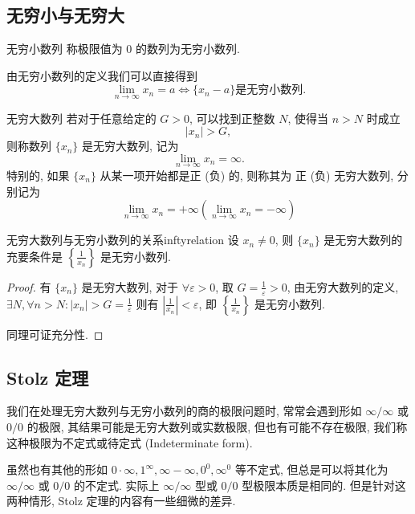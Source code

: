 \documentclass[cn,toc=twocol]{elegantbook}
\begin{document}
\subsection{无穷小与无穷大}
\begin{definition}{无穷小数列}
	称极限值为 $0$ 的数列为无穷小数列.
\end{definition}

由无穷小数列的定义我们可以直接得到
\[
	\lim_{n \to \infty} x_n = a \iff \{x_n - a\} \text{是无穷小数列}.
\]

\begin{definition}{无穷大数列}
	若对于任意给定的 $G > 0$, 可以找到正整数 $N$, 使得当 $n > N$ 时成立
	\[
		\lvert x_n \rvert > G,
	\] 
	则称数列 $\{x_n\}$ 是无穷大数列, 记为
	\[
		\lim_{n\to\infty} x_n = \infty.
	\]
	特别的, 如果 $\{x_n\}$ 从某一项开始都是正 (负) 的, 则称其为 正 (负) 无穷大数列, 分别记为
	\[
		\lim_{n\to\infty} x_n = +\infty (\lim_{n\to\infty} x_n = -\infty)
	\]	
\end{definition}

\begin{theorem}{无穷大数列与无穷小数列的关系}{inftyrelation}
	设 $x_n \neq 0$, 则 $\{x_n\}$ 是无穷大数列的充要条件是 $\left\{\frac{1}{x_n}\right\}$ 是无穷小数列.
\end{theorem}

\begin{proof}
	有 $\{x_n\}$ 是无穷大数列, 对于 $\forall \varepsilon > 0$, 取 $G = \frac{1}{\varepsilon} > 0$, 由无穷大数列的定义, $\exists N, \forall n > N: \lvert x_n \rvert > G = \frac{1}{\varepsilon}$ 则有 $\left\lvert\frac{1}{x_n} \right\rvert< \varepsilon$, 即 $\left\{\frac{1}{x_n}\right\}$ 是无穷小数列.
	
	同理可证充分性.
\end{proof}







\subsection{Stolz 定理}

我们在处理无穷大数列与无穷小数列的商的极限问题时, 常常会遇到形如 $\infty/\infty$ 或 $0/0$ 的极限, 其结果可能是无穷大数列或实数极限, 但也有可能不存在极限, 我们称这种极限为不定式或待定式 (Indeterminate form).

\begin{remark}
虽然也有其他的形如 $0\cdot \infty , 1^{\infty }, \infty -\infty , 0^{0}, \infty ^{0}$ 等不定式, 但总是可以将其化为 $\infty/\infty$ 或 $0/0$ 的不定式. 实际上 $\infty/\infty$ 型或 $0/0$ 型极限本质是相同的. 但是针对这两种情形, Stolz 定理的内容有一些细微的差异.
\end{remark}
\end{document}
